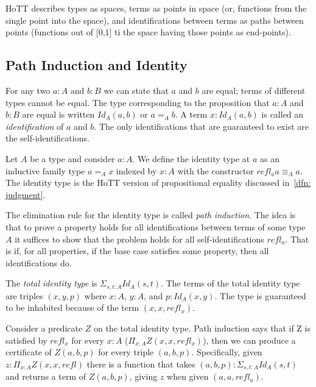 \documentclass{article}
\begin{document}
HoTT describes types as spaces, terms as points in space (or, functions from the single point into the space), and identifications between terms as paths between points (functions out of [0,1] ti the space having those points as end-points).

\subsection{Path Induction and Identity}

For any two $a : A$ and $b : B$ we can state that $a$ and $b$ are equal; terms of different types cannot be equal. The type corresponding to the proposition that $a : A$ and $b : B$ are equal is written $Id_{A}(a, b)$ or $a =_{A} b$. A term $x : Id_{A}(a, b)$ is called an \emph{identification} of $a$ and $b$. The only identifications that are guaranteed to exist are the self-identifications.

\begin{definition}\label{dfn: identity-type}
  Let $A$ be a type and consider $a : A$. We define the identity type at $a$ as an inductive family type $a =_{A} x$ indexed by $x : A$ with the constructor $refl_{a} a \equiv_{A} a$. The identity type is the HoTT version of propositional equality discussed in~\cref{dfn: judgment}.
\end{definition}

The elimination rule for the identity type is called \emph{path induction}. The idea is that to prove a property holds for all identifications between terms of some type $A$ it suffices to show that the problem holds for all self-identifications $refl_{a}$. That is if, for all properties, if the base case satisfies some property, then all identifications do.

The \emph{total identity type} is $\Sigma_{s, t : A} Id_{A}(s, t)$. The terms of the total identity type are triples $(x, y, p)$ where $x : A$, $y : A$, and $p : Id_{A}(x, y)$. The type is guaranteed to be inhabited because of the term $(x, x, refl_{x})$.

Consider a predicate $Z$ on the total identity type. Path induction says that if Z is satisfied by $refl_{x}$ for every $x : A$ ($\Pi_{x : A} Z(x,x,refl_{x})$), then we can produce a certificate of $Z(a, b, p)$ for every triple $(a, b, p)$. Specifically, given $z : \Pi_{x : A} Z(x, x, refl)$ there is a function that takes $(a, b, p) : \Sigma_{s, t : A} Id_{A}(s, t)$ and returns a term of $Z(a, b, p)$, giving $z$ when given $(a, a, refl_{a})$.
\end{document}

